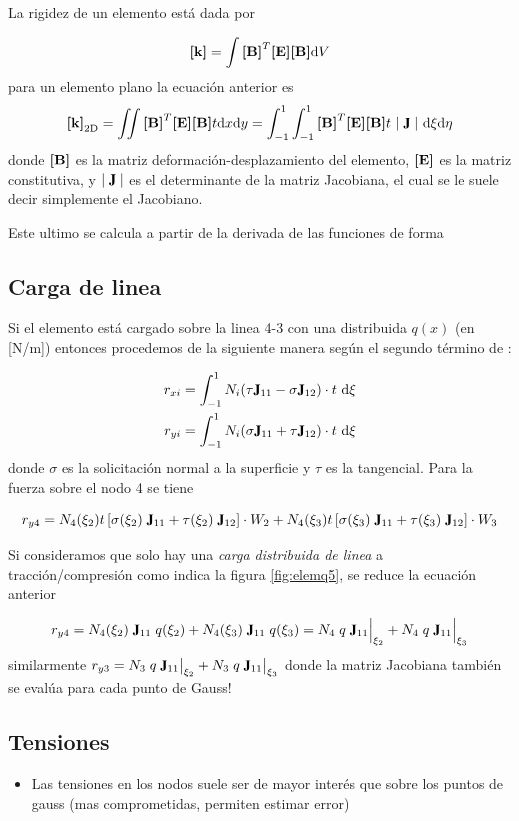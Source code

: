 La rigidez de un elemento está dada por 


\begin{equation} \label{eq:RigidezElemento}
\boldsymbol{[}\mathbf{k} \boldsymbol{]}=\int \boldsymbol{[}\mathbf{B} \boldsymbol{]}^T \boldsymbol{[}\mathbf{E} \boldsymbol{]} \boldsymbol{[}\mathbf{B} \boldsymbol{]} \textrm{d} V
\end{equation}
para un elemento plano la ecuación anterior es
\[
\Mk_{\mathrm{2D}}=\iint \MB^T \ME \MB t \di x \di y=\int^1_{-1}\int^1_{-1} \MB^T \ME \MB t \ \Djac \  \di\xi  \di\eta
\]
donde $\boldsymbol{[}\mathbf{B} \boldsymbol{]}$ es la matriz deformación-desplazamiento del elemento, $\boldsymbol{[}\mathbf{E} \boldsymbol{]}$ es la matriz constitutiva, y $\Djac$ es el determinante de la matriz Jacobiana, el cual se le suele decir simplemente el Jacobiano.

Este ultimo se calcula a partir de la derivada de las funciones de forma $ $

\subsection*{Carga de linea}
Si el elemento está cargado sobre la linea 4-3 con una distribuida $q(x)$ (en [N/m]) entonces procedemos de la siguiente manera según el segundo término de : 

\begin{align}
r_{xi}&=\int^1_{-1}N_i (\tau \jac_{11}- \sigma \jac_{12})\cdot t~\di \xi \\
r_{yi}&=\int^1_{-1}N_i (\sigma \jac_{11}+\tau \jac_{12})\cdot t~ \di \xi 
\end{align}
donde $\sigma$ es la solicitación normal a la superficie y $\tau$ es la tangencial. Para la fuerza sobre el nodo 4 se tiene

$$r_{y4}= N_4(\xi_2)t\left[\sigma(\xi_2)\; \jac_{11}+\tau(\xi_2)\; \jac_{12}\right] \cdot W_2 + N_4(\xi_3)t\left[\sigma(\xi_3)\; \jac_{11}+\tau(\xi_3)\; \jac_{12}\right]\cdot W_3 $$

Si consideramos que solo hay una \emph{carga distribuida de linea} a tracción/compresión como indica la figura \ref{fig:elemq5}, se reduce la ecuación anterior

$$ r_{y4} = N_4(\xi_2)\;\jac_{11}\;q(\xi_2) + N_4(\xi_3)\;\jac_{11}\;q(\xi_3) =N_4\;q \;\jac_{11}\Big|_{\xi_2} + N_4\;q\; \jac_{11}\Big|_{\xi_3} $$
similarmente $r_{y3} = N_3\;q \;\jac_{11}\big|_{\xi_2} + N_3\;q\; \jac_{11}\big|_{\xi_3} $ donde la matriz Jacobiana también se evalúa para cada punto de Gauss!


\subsection*{Tensiones}
\begin{itemize}
	\item Las tensiones en los nodos suele ser de mayor interés que sobre los puntos de gauss (mas comprometidas, permiten estimar error)
\end{itemize}

